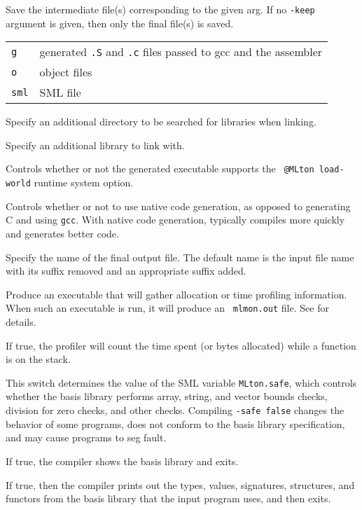 \begin{description}
Save the intermediate file(s) corresponding to the given arg.  If
no {\tt -keep} argument is given, then only the final file(s) is saved.\\
\begin{tabular}{ll}
{\tt g} & generated {\tt .S} and {\tt .c} files passed to gcc and the assembler\\
{\tt o} & object files\\
{\tt sml} & SML file\\
\end{tabular}

Specify an additional directory to be searched for libraries when
linking.

Specify an additional library to link with.

Controls whether or not the generated executable supports the {\tt
@MLton load-world} runtime system option.

Controls whether or not to use native code generation, as opposed to
generating C and using {\tt gcc}.  With native code generation,
{\mlton} typically compiles more quickly and generates better code.

Specify the name of the final output file. The default name is the
input file name with its suffix removed and an appropriate suffix
added.

Produce an executable that will gather allocation or time profiling
information.  When such an executable is run, it will produce an {\tt
mlmon.out} file.  See  for details.

If true, the profiler will count the time spent (or bytes allocated)
while a function is on the stack.

This switch determines the value of the SML variable {\tt MLton.safe}, which
controls whether the basis library performs array, string, and vector bounds
checks, division for zero checks, and other checks.  Compiling {\tt -safe false}
changes the behavior of some programs, does not conform to the basis library
specification, and may cause programs to seg fault.

If true, the compiler shows the basis library and exits.

If true, then the compiler prints out the types, values, signatures, structures,
and functors from the basis library that the input program uses, and then exits.


\end{description}
